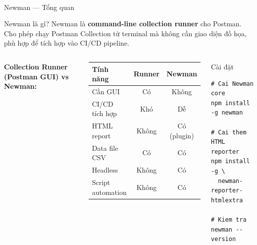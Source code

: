 \documentclass[aspectratio=169,10pt]{beamer}
\newcommand{\sref}[1]{\textsuperscript{\scriptsize\cite{#1}}}
\begin{document}
\begin{frame}[fragile]{Newman --- Tổng quan\sref{newman}}
  \begin{block}{Newman là gì?}
    Newman là \textbf{command-line collection runner} cho Postman.
    Cho phép chạy Postman Collection từ terminal mà không cần
    giao diện đồ họa, phù hợp để tích hợp vào CI/CD pipeline.
  \end{block}

  \vspace{0.4em}
  \begin{columns}
    \textbf{Collection Runner (Postman GUI) vs Newman:}
    \begin{center}
    \small
    \begin{tabular}{lcc}
      \toprule
      \textbf{Tính năng} & \textbf{Runner} & \textbf{Newman} \\
      \midrule
      Cần GUI       & Có  & Không \\
      CI/CD tích hợp & Khó & Dễ \\
      HTML report   & Không & Có (plugin) \\
      Data file CSV & Có  & Có \\
      Headless      & Không & Có \\
      Script automation & Không & Có \\
      \bottomrule
    \end{tabular}
    \end{center}

    \begin{block}{Cài đặt}
\begin{lstlisting}[style=bash]
# Cai Newman core
npm install -g newman

# Cai them HTML reporter
npm install -g \
  newman-reporter-htmlextra

# Kiem tra
newman --version
\end{lstlisting}
    \end{block}
  \end{columns}
\end{frame}
\end{document}

